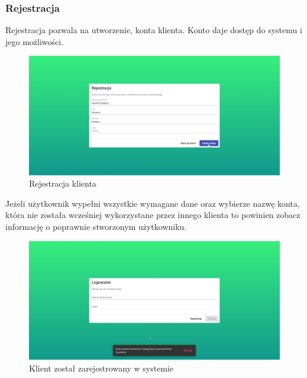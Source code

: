 \documentclass[a4paper,twoside,12pt]{book}
\begin{document}
\subsubsection{Rejestracja}
Rejestracja pozwala na utworzenie, konta klienta. Konto daje dostęp do systemu i jego możliwości.
\begin{figure}[H]
	\centering
	\includegraphics[width=1\linewidth]{../zrzuty_ekranu/dzialanie/rejestracja_logowanie/rejestracja}
	\caption{Rejestracja klienta}
	\label{fig:rejestracja}
\end{figure}
Jeżeli użytkownik wypełni wszystkie wymagane dane oraz wybierze nazwę konta, która nie została wcześniej wykorzystane przez innego klienta to powinien zobacz informację o poprawnie stworzonym użytkowniku.
\begin{figure}[H]
	\centering
	\includegraphics[width=1\linewidth]{../zrzuty_ekranu/dzialanie/rejestracja_logowanie/konto_utworzone}
	\caption{Klient został zarejestrowany w systemie}
	\label{fig:kontoutworzone}
\end{figure}
\end{document}
